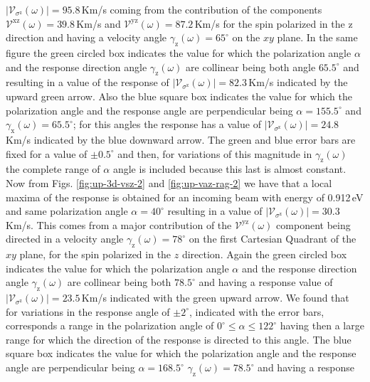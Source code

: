 \documentclass[prb,11pt,tightenlines,twocolumn,aps]{revtex4-1}
\begin{document}
$|\mathcal{V}_{\sigma^{\mathrm{z}}}(\omega)|=95.8$\,Km/s coming from the
contribution of the components $\mathcal{V}^{\mathrm{xz}}(\omega)=39.8$\,Km/s
and $\mathcal{V}^{\mathrm{yz}}(\omega)=87.2$\,Km/s for the spin polarized in the
$\mathrm{z}$ direction and having a velocity angle
$\gamma_{\mathrm{z}}(\omega)=65^{\circ}$ on the $xy$ plane.
% 
In the same figure the green circled box indicates the value for which the
polarization angle $\alpha$ and the response direction angle
$\gamma_{\mathrm{z}}(\omega)$ are collinear being both angle $65.5^{\circ}$ and
resulting in a value of the response of
$|\mathcal{V}_{\sigma^{\mathrm{z}}}(\omega)|=82.3$\,Km/s indicated by the upward
green arrow.
% 
Also the blue square box indicates the value for which the polarization angle
and the response angle are perpendicular being $\alpha=155.5^{\circ}$ and
$\gamma_{\mathrm{x}}(\omega)=65.5^{\circ}$; for this angles the response has a
value of $|\mathcal{V}_{\sigma^{\mathrm{z}}}(\omega)|=24.8$\,Km/s indicated by
the blue downward arrow.
% 
The green and blue error bars are fixed for a value of $\pm0.5^{\circ}$ and
then, for variations of this magnitude in $\gamma_{\mathrm{z}}(\omega)$ the
complete range of $\alpha$ angle is included because this last is almost
constant.
% 
Now from Figs. \ref{fig:up-3d-vsz-2} and \ref{fig:up-vaz-rag-2} we have that a
local maxima of the response is obtained for an incoming beam with energy of
0.912\,eV and same polarization angle $\alpha=40^{\circ}$ resulting in a value
of $|\mathcal{V}_{\sigma^{\mathrm{z}}}(\omega)|=30.3$\,Km/s. This comes from a
major contribution of the $\mathcal{V}^{\mathrm{yz}}(\omega)$ component being
directed in a velocity angle $\gamma_{\mathrm{z}}(\omega)=78^{\circ}$ on the
first Cartesian Quadrant of the $xy$ plane, for the spin polarized in the $z$
direction.
% 
Again the green circled box indicates the value for which the polarization angle
$\alpha$ and the response direction angle $\gamma_{\mathrm{z}}(\omega)$ are
collinear being both $78.5^{\circ}$ and having a response value of
$|\mathcal{V}_{\sigma^{\mathrm{z}}}(\omega)|=23.5$\,Km/s indicated with the
green upward arrow. We found that for variations in the response angle of $\pm
2^{\circ}$, indicated with the error bars, corresponds a range in the
polarization angle of $0^{\circ} \leq \alpha \leq 122^{\circ}$ having then a
large range for which the direction of the response is directed to this angle.
% 
The blue square box indicates the value for which the polarization angle and the
response angle are perpendicular being $\alpha=168.5^{\circ}$
$\gamma_{\mathrm{z}}(\omega)=78.5^{\circ}$ and having a response
\end{document}
